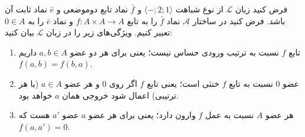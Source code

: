 فرض کنید زبان
$\mathcal{L}$
از نوع شباهت
$\langle\mathord{-};2;1\rangle$
و
$\bar f$
نماد تابع دوموضعی
و
$\bar e$
نماد ثابت آن باشد. فرض کنید در ساختار
$\mathcal{A}$
نماد
$\bar f$
را به تابع
$f\colon A\times A\to A$
و نماد
$\bar e$
را به
$0\in A$
تعبیر کنیم.
ویژگی‌های زیر را در زبان
$\mathcal{L}$
بیان کنید:
\begin{enumerate}[label=(\alph*)]
    \item تابع $f$ نسبت به ترتیب ورودی حساس نیست؛ یعنی برای هر دو عضو
    $a,b\in A$
    داریم $f(a,b)=f(b,a)$.
    \item عضو $0$ نسبت به تابع $f$ خنثی است؛ یعنی تابع $f$ اگر روی
    $0$
    و هر عضو $a\in A$
    (با هر ترتیبی)
    اعمال شود خروجی همان $a$ خواهد بود.
    \item هر عضو
    $A$ نسبت به عمل $f$ وارون دارد؛ یعنی برای هر عضو $a$ عضو $a'$ هست که $f(a,a')=0$.
\end{enumerate}

